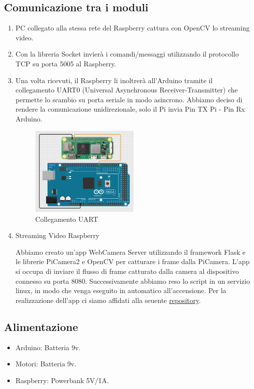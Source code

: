 \documentclass{article}
\begin{document}
\subsection{Comunicazione tra i moduli}
\begin{enumerate}
\item PC collegato alla stessa rete del Raspberry cattura con OpenCV lo streaming video.
\item  Con la libreria Socket invierà i comandi/messaggi utilizzando il protocollo TCP su porta 5005 al Raspberry.
\item Una volta ricevuti, il Raspberry li inoltrerà all'Arduino tramite il collegamento UART0 (Universal Asynchronous Receiver-Transmitter) che permette lo scambio su porta seriale in modo asincrono. Abbiamo deciso di rendere la comunicazione unidirezionale, solo il Pi invia Pin TX Pi - Pin Rx Arduino.  
\begin{figure}[h!]
  \centering
  \includegraphics[width=0.5\textwidth]{img/uart0.png}
    \caption{Collegamento UART}
\end{figure}

\item \cite{flaskstream} Streaming Video Raspberry

    Abbiamo creato un'app WebCamera Server utilizzando il framework Flask e le librerie PiCamera2 e OpenCV per catturare i frame dalla PiCamera. L'app si occupa di inviare il flusso di frame catturato dalla camera al dispositivo connesso su porta 8080.
    Successivamente abbiamo reso lo script in un servizio linux, in modo che venga eseguito in automatico all'accensione. Per la realizzazione dell'app ci siamo affidati alla seuente \href{https://github.com/miguelgrinberg/flask-video-streaming/tree/v1}{repository}. 
\end{enumerate}

\newpage

\subsection{Alimentazione}
\begin{itemize}
\item Arduino: Batteria 9v.
\item Motori: Batteria 9v.
\item Raspberry: Powerbank 5V/1A.
\end{itemize}
\end{document}
